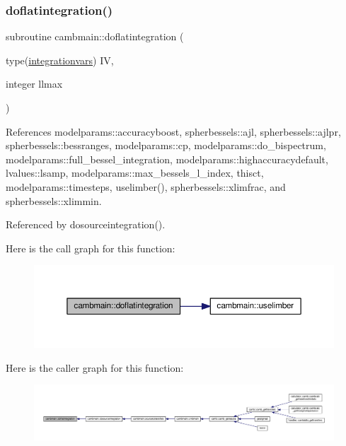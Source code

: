 \subsubsection{\texorpdfstring{doflatintegration()}{doflatintegration()}}
{\footnotesize\ttfamily subroutine cambmain\+::doflatintegration (\begin{DoxyParamCaption}\item[{type(\mbox{\hyperlink{structcambmain_1_1integrationvars}{integrationvars}})}]{IV,  }\item[{integer}]{llmax }\end{DoxyParamCaption})\hspace{0.3cm}{\ttfamily [private]}}



References modelparams\+::accuracyboost, spherbessels\+::ajl, spherbessels\+::ajlpr, spherbessels\+::bessranges, modelparams\+::cp, modelparams\+::do\+\_\+bispectrum, modelparams\+::full\+\_\+bessel\+\_\+integration, modelparams\+::highaccuracydefault, lvalues\+::lsamp, modelparams\+::max\+\_\+bessels\+\_\+l\+\_\+index, thisct, modelparams\+::timesteps, uselimber(), spherbessels\+::xlimfrac, and spherbessels\+::xlimmin.



Referenced by dosourceintegration().

Here is the call graph for this function\+:
\nopagebreak
\begin{figure}[H]
\begin{center}
\leavevmode
\includegraphics[width=350pt]{namespacecambmain_a66b6d740c5e702807d5454979eec8cde_cgraph}
\end{center}
\end{figure}
Here is the caller graph for this function\+:
\nopagebreak
\begin{figure}[H]
\begin{center}
\leavevmode
\includegraphics[width=350pt]{namespacecambmain_a66b6d740c5e702807d5454979eec8cde_icgraph}
\end{center}
\end{figure}
\mbox{\label{namespacecambmain_af0980e25384f7d9b2eb64435231f3aa5}} 
